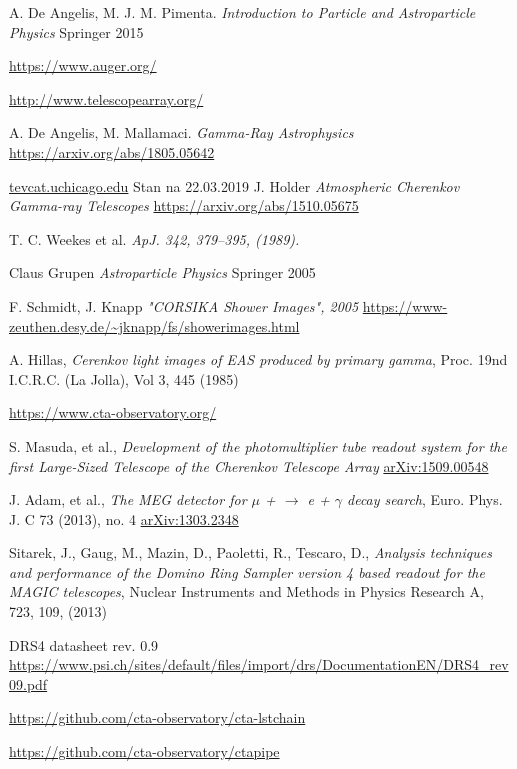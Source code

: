 \documentclass[a4paper,11pt,twoside]{article}
\begin{document}
\newpage
\begin{thebibliography}{9}
A. De Angelis, M. J. M. Pimenta.
\textit{Introduction to Particle and Astroparticle Physics} Springer 2015

\url{https://www.auger.org/}

\url{http://www.telescopearray.org/}

A. De Angelis, M. Mallamaci.
\textit{Gamma-Ray Astrophysics} 
\url{https://arxiv.org/abs/1805.05642}

\url{tevcat.uchicago.edu}
Stan na 22.03.2019
J. Holder
\textit{Atmospheric Cherenkov Gamma-ray Telescopes}
\url{https://arxiv.org/abs/1510.05675}

T. C. Weekes et al.
\textit{ApJ. 342, 379–395, (1989).}

Claus Grupen
\textit{Astroparticle Physics} Springer 2005

F. Schmidt, J. Knapp
\textit{"CORSIKA Shower Images", 2005}
\url{https://www-zeuthen.desy.de/~jknapp/fs/showerimages.html}

A. Hillas, 
\textit{Cerenkov light images of EAS produced by primary gamma},
Proc. 19nd I.C.R.C. (La Jolla), Vol 3, 445 (1985)

\url{https://www.cta-observatory.org/}

S. Masuda, et al., 
\textit{Development of the photomultiplier tube readout
system for the first Large-Sized Telescope of the
Cherenkov Telescope Array}
\url{arXiv:1509.00548}

J. Adam, et al.,
\textit{The MEG detector for $\mu$ + $\rightarrow$ e + $\gamma$ decay search}, Euro. Phys. J. C 73 (2013), no. 4
\url{arXiv:1303.2348}

Sitarek, J., Gaug, M., Mazin, D., Paoletti, R., Tescaro, D., \textit{Analysis techniques and performance of the Domino Ring Sampler version 4 based readout for the MAGIC
telescopes}, Nuclear Instruments and Methods in Physics Research A, 723, 109, (2013)

DRS4 datasheet rev. 0.9
\url{https://www.psi.ch/sites/default/files/import/drs/DocumentationEN/DRS4_rev09.pdf}

\url{https://github.com/cta-observatory/cta-lstchain}

\url{https://github.com/cta-observatory/ctapipe}
\end{thebibliography}
\end{document}
